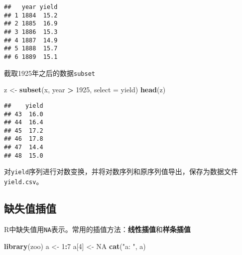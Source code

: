 \documentclass[]{article}
\newenvironment{Shaded}{\begin{snugshade}}{\end{snugshade}}
\newcommand{\CommentTok}[1]{\textcolor[rgb]{0.56,0.35,0.01}{\textit{#1}}}
\newcommand{\DataTypeTok}[1]{\textcolor[rgb]{0.13,0.29,0.53}{#1}}
\newcommand{\DecValTok}[1]{\textcolor[rgb]{0.00,0.00,0.81}{#1}}
\newcommand{\KeywordTok}[1]{\textcolor[rgb]{0.13,0.29,0.53}{\textbf{#1}}}
\newcommand{\NormalTok}[1]{#1}
\newcommand{\OperatorTok}[1]{\textcolor[rgb]{0.81,0.36,0.00}{\textbf{#1}}}
\newcommand{\OtherTok}[1]{\textcolor[rgb]{0.56,0.35,0.01}{#1}}
\newcommand{\StringTok}[1]{\textcolor[rgb]{0.31,0.60,0.02}{#1}}
\begin{document}
\begin{verbatim}
##   year yield
## 1 1884  15.2
## 2 1885  16.9
## 3 1886  15.3
## 4 1887  14.9
## 5 1888  15.7
## 6 1889  15.1
\end{verbatim}

截取1925年之后的数据\texttt{subset}

\begin{Shaded}
\begin{Highlighting}[]
\NormalTok{z <-}\StringTok{ }\KeywordTok{subset}\NormalTok{(x, year }\OperatorTok{>}\StringTok{ }\DecValTok{1925}\NormalTok{, }\DataTypeTok{select =}\NormalTok{ yield)}
\KeywordTok{head}\NormalTok{(z)}
\end{Highlighting}
\end{Shaded}

\begin{verbatim}
##    yield
## 43  16.0
## 44  16.4
## 45  17.2
## 46  17.8
## 47  14.4
## 48  15.0
\end{verbatim}

对\texttt{yield}序列进行对数变换，并将对数序列和原序列值导出，保存为数据文件\texttt{yield.csv}。

\begin{Shaded}
\end{Shaded}

\hypertarget{ux7f3aux5931ux503cux63d2ux503c}{%
\subsection{缺失值插值}\label{ux7f3aux5931ux503cux63d2ux503c}}

R中缺失值用\texttt{NA}表示。常用的插值方法：\textbf{线性插值}和\textbf{样条插值}

\begin{Shaded}
\begin{Highlighting}[]
\KeywordTok{library}\NormalTok{(zoo)}
\NormalTok{a <-}\StringTok{ }\DecValTok{1}\OperatorTok{:}\DecValTok{7}
\NormalTok{a[}\DecValTok{4}\NormalTok{] <-}\StringTok{ }\OtherTok{NA}
\KeywordTok{cat}\NormalTok{(}\StringTok{"a: "}\NormalTok{, a)}
\end{Highlighting}
\end{Shaded}
\end{document}
